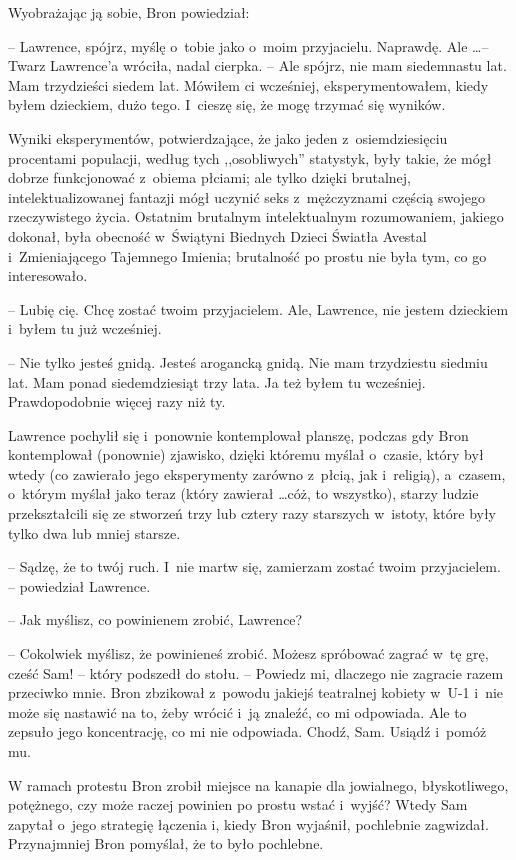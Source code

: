 \documentclass[oneside,polish,11pt,rmheadings]{mwbk}
\begin{document}
Wyobrażając ją sobie, Bron powiedział: 

-- Lawrence, spójrz, myślę o~tobie jako o~moim przyjacielu. Naprawdę. Ale \ldots  -- Twarz Lawrence'a wróciła, nadal cierpka. -- Ale spójrz, nie mam siedemnastu lat. Mam trzydzieści siedem lat. Mówiłem ci wcześniej, eksperymentowałem, kiedy byłem dzieckiem, dużo tego. I~cieszę się, że mogę trzymać się wyników. 

Wyniki eksperymentów, potwierdzające, że jako jeden z~osiemdziesięciu procentami populacji, według tych ,,osobliwych'' statystyk, były takie, że mógł dobrze funkcjonować z~obiema płciami; ale tylko dzięki brutalnej, intelektualizowanej fantazji mógł uczynić seks z~mężczyznami częścią swojego rzeczywistego życia. Ostatnim brutalnym intelektualnym rozumowaniem, jakiego dokonał, była obecność w~Świątyni Biednych Dzieci Światła Avestal i~Zmieniającego Tajemnego Imienia; brutalność po prostu nie była tym, co go interesowało.  

-- Lubię cię. Chcę zostać twoim przyjacielem. Ale, Lawrence, nie jestem dzieckiem i~byłem tu już wcześniej.  

-- Nie tylko jesteś gnidą. Jesteś arogancką gnidą. Nie mam trzydziestu siedmiu lat. Mam ponad siedemdziesiąt trzy lata. Ja też byłem tu wcześniej. Prawdopodobnie więcej razy niż ty. 

 Lawrence pochylił się i~ponownie kontemplował planszę, podczas gdy Bron kontemplował (ponownie) zjawisko, dzięki któremu myślał o~czasie, który był wtedy (co zawierało jego eksperymenty zarówno z~płcią, jak i~religią), a~czasem, o~którym myślał jako teraz (który zawierał  \ldots  cóż, to wszystko), starzy ludzie przekształcili się ze stworzeń trzy lub cztery razy starszych w~istoty, które były tylko dwa lub mniej starsze. 
 
  -- Sądzę, że to twój ruch. I~nie martw się, zamierzam zostać twoim przyjacielem. -- powiedział Lawrence. 

-- Jak myślisz, co powinienem zrobić, Lawrence? 

-- Cokolwiek myślisz, że powinieneś zrobić. Możesz spróbować zagrać w~tę grę, cześć Sam! -- który podszedł do stołu. -- Powiedz mi, dlaczego nie zagracie razem przeciwko mnie. Bron zbzikował z~powodu jakiejś teatralnej kobiety w~U-1 i~nie może się nastawić na to, żeby wrócić i~ją znaleźć, co mi odpowiada. Ale to zepsuło jego koncentrację, co mi nie odpowiada. Chodź, Sam.  Usiądź i~pomóż mu. 

W ramach protestu Bron zrobił miejsce na kanapie dla jowialnego, błyskotliwego, potężnego, czy może raczej powinien po prostu wstać i~wyjść? Wtedy Sam zapytał o~jego strategię łączenia i, kiedy Bron wyjaśnił, pochlebnie zagwizdał. Przynajmniej Bron pomyślał, że to było pochlebne. 
\end{document}

